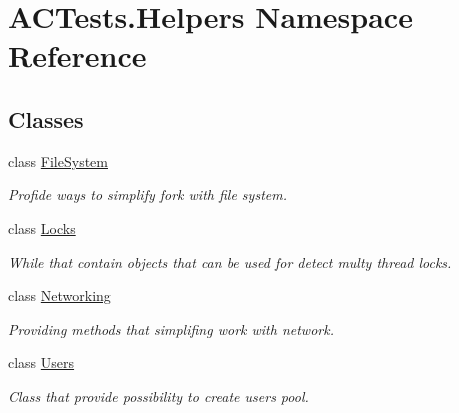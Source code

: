\hypertarget{namespace_a_c_tests_1_1_helpers}{}\section{A\+C\+Tests.\+Helpers Namespace Reference}
\label{namespace_a_c_tests_1_1_helpers}
\subsection*{Classes}
\begin{DoxyCompactItemize}
\item 
class \mbox{\hyperlink{class_a_c_tests_1_1_helpers_1_1_file_system}{File\+System}}
\begin{DoxyCompactList}\small\item\em Profide ways to simplify fork with file system. \end{DoxyCompactList}\item 
class \mbox{\hyperlink{class_a_c_tests_1_1_helpers_1_1_locks}{Locks}}
\begin{DoxyCompactList}\small\item\em While that contain objects that can be used for detect multy thread locks. \end{DoxyCompactList}\item 
class \mbox{\hyperlink{class_a_c_tests_1_1_helpers_1_1_networking}{Networking}}
\begin{DoxyCompactList}\small\item\em Providing methods that simplifing work with network. \end{DoxyCompactList}\item 
class \mbox{\hyperlink{class_a_c_tests_1_1_helpers_1_1_users}{Users}}
\begin{DoxyCompactList}\small\item\em Class that provide possibility to create users pool. \end{DoxyCompactList}\end{DoxyCompactItemize}
